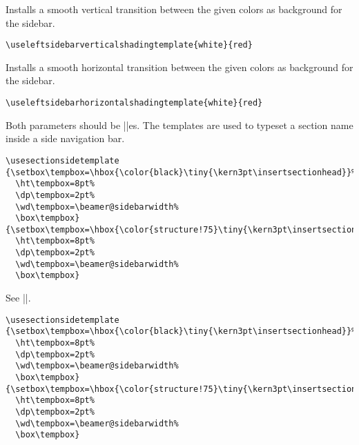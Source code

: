 \begin{command}{\useleftsidebarverticalshadingtemplate{}}
  Installs a smooth vertical transition between the given colors as
  background for the sidebar.
  \example
\begin{verbatim}
\useleftsidebarverticalshadingtemplate{white}{red}
\end{verbatim}
\end{command}


\begin{command}{\useleftsidebarhorizontalshadingtemplate{}}
  Installs a smooth horizontal transition between the given colors as
  background for the sidebar.
  \example
\begin{verbatim}
\useleftsidebarhorizontalshadingtemplate{white}{red}
\end{verbatim}
\end{command}


\begin{command}{\usesectionsidetemplate{}}
  Both parameters should be |\hbox|es. The templates are used to
  typeset a section name inside a side navigation bar.
  \example
\begin{verbatim}
\usesectionsidetemplate
{\setbox\tempbox=\hbox{\color{black}\tiny{\kern3pt\insertsectionhead}}%
  \ht\tempbox=8pt%
  \dp\tempbox=2pt%
  \wd\tempbox=\beamer@sidebarwidth%
  \box\tempbox}
{\setbox\tempbox=\hbox{\color{structure!75}\tiny{\kern3pt\insertsectionhead}}%
  \ht\tempbox=8pt%
  \dp\tempbox=2pt%
  \wd\tempbox=\beamer@sidebarwidth%
  \box\tempbox}
\end{verbatim}
\end{command}



\begin{command}{\usesubsectionsidetemplate{}}
  See |\usesectionsidetemplate|.
  \example
\begin{verbatim}
\usesectionsidetemplate
{\setbox\tempbox=\hbox{\color{black}\tiny{\kern3pt\insertsectionhead}}%
  \ht\tempbox=8pt%
  \dp\tempbox=2pt%
  \wd\tempbox=\beamer@sidebarwidth%
  \box\tempbox}
{\setbox\tempbox=\hbox{\color{structure!75}\tiny{\kern3pt\insertsectionhead}}%
  \ht\tempbox=8pt%
  \dp\tempbox=2pt%
  \wd\tempbox=\beamer@sidebarwidth%
  \box\tempbox}
\end{verbatim}
\end{command}














